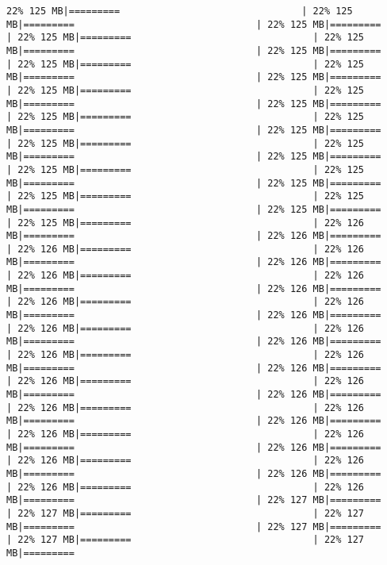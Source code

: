 \documentclass[
]{article}
\begin{document}
\begin{verbatim}
22% 125 MB|=========                                | 22% 125 MB|=========                                | 22% 125 MB|=========                                | 22% 125 MB|=========                                | 22% 125 MB|=========                                | 22% 125 MB|=========                                | 22% 125 MB|=========                                | 22% 125 MB|=========                                | 22% 125 MB|=========                                | 22% 125 MB|=========                                | 22% 125 MB|=========                                | 22% 125 MB|=========                                | 22% 125 MB|=========                                | 22% 125 MB|=========                                | 22% 125 MB|=========                                | 22% 125 MB|=========                                | 22% 125 MB|=========                                | 22% 125 MB|=========                                | 22% 125 MB|=========                                | 22% 125 MB|=========                                | 22% 125 MB|=========                                | 22% 125 MB|=========                                | 22% 125 MB|=========                                | 22% 125 MB|=========                                | 22% 125 MB|=========                                | 22% 126 MB|=========                                | 22% 126 MB|=========                                | 22% 126 MB|=========                                | 22% 126 MB|=========                                | 22% 126 MB|=========                                | 22% 126 MB|=========                                | 22% 126 MB|=========                                | 22% 126 MB|=========                                | 22% 126 MB|=========                                | 22% 126 MB|=========                                | 22% 126 MB|=========                                | 22% 126 MB|=========                                | 22% 126 MB|=========                                | 22% 126 MB|=========                                | 22% 126 MB|=========                                | 22% 126 MB|=========                                | 22% 126 MB|=========                                | 22% 126 MB|=========                                | 22% 126 MB|=========                                | 22% 126 MB|=========                                | 22% 126 MB|=========                                | 22% 126 MB|=========                                | 22% 126 MB|=========                                | 22% 126 MB|=========                                | 22% 126 MB|=========                                | 22% 126 MB|=========                                | 22% 126 MB|=========                                | 22% 126 MB|=========                                | 22% 126 MB|=========                                | 22% 126 MB|=========                                | 22% 126 MB|=========                                | 22% 127 MB|=========                                | 22% 127 MB|=========                                | 22% 127 MB|=========                                | 22% 127 MB|=========                                | 22% 127 MB|=========                                | 22% 127 MB|=========     
\end{verbatim}
\end{document}
